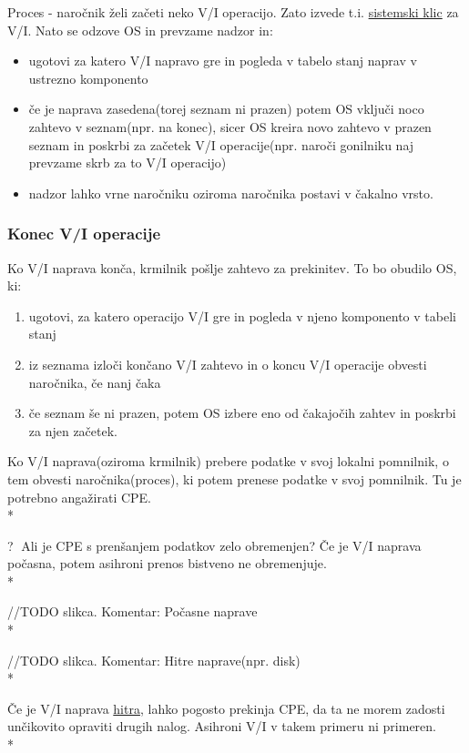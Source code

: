 \documentclass[
  slovene,
  a4paper
]{book}
\begin{document}
Proces - naročnik želi začeti neko V/I operacijo. Zato izvede t.i. \underline{sistemski klic} za V/I. Nato se odzove OS in prevzame nadzor in:

\begin{itemize}
  \item ugotovi za katero V/I napravo gre in pogleda v tabelo stanj naprav v ustrezno komponento
  \item če je naprava zasedena(torej seznam ni prazen) potem OS vključi noco zahtevo v seznam(npr. na konec), sicer OS kreira novo zahtevo v prazen seznam in poskrbi za začetek V/I operacije(npr. naroči gonilniku naj prevzame skrb za to V/I operacijo)
  \item nadzor lahko vrne naročniku oziroma naročnika postavi v čakalno vrsto.
\end{itemize}

\subsubsection{Konec V/I operacije}

Ko V/I naprava konča, krmilnik pošlje zahtevo za prekinitev. To bo obudilo OS, ki:
\begin{enumerate}
  \item ugotovi, za katero operacijo V/I gre in pogleda v njeno komponento v tabeli stanj
  \item iz seznama izloči končano V/I zahtevo in o koncu V/I operacije obvesti naročnika, če nanj čaka
  \item če seznam še ni prazen, potem OS izbere eno od čakajočih zahtev in poskrbi za njen začetek.
\end{enumerate}

Ko V/I naprava(oziroma krmilnik) prebere podatke v svoj lokalni pomnilnik, o tem obvesti naročnika(proces), ki potem prenese podatke v svoj pomnilnik. Tu je potrebno angažirati CPE.\\*

\textcircled{?} Ali je CPE s prenšanjem podatkov zelo obremenjen? Če je V/I naprava počasna, potem asihroni prenos bistveno ne obremenjuje.\\*

//TODO slikca. Komentar: Počasne naprave \\*

//TODO slikca. Komentar: Hitre naprave(npr. disk) \\*

Če je V/I naprava \underline{hitra}, lahko pogosto prekinja CPE, da ta ne morem zadosti unčikovito opraviti drugih nalog. Asihroni V/I v takem primeru ni primeren.\\*
\end{document}
